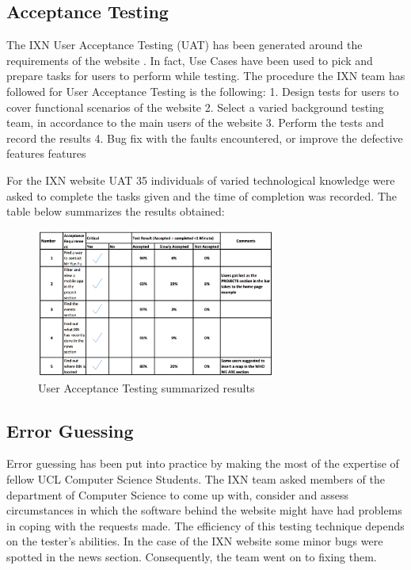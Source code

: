 \documentclass[fontsize=10pt]{extarticle}
\numberwithin{figure}{section} %
\begin{document}
\hypertarget{acceptance-testing}{%
\subsection{Acceptance Testing}\label{acceptance-testing}}

The IXN User Acceptance Testing (UAT) has been generated around the
requirements of the website \cite{g7} . In fact, Use Cases have been
used to pick and prepare tasks for users to perform while testing. The
procedure the IXN team has followed for User Acceptance Testing is the
following: 1. Design tests for users to cover functional scenarios of
the website 2. Select a varied background testing team, in accordance to
the main users of the website 3. Perform the tests and record the
results 4. Bug fix with the faults encountered, or improve the defective
features features

For the IXN website UAT 35 individuals of varied technological knowledge
were asked to complete the tasks given and the time of completion was
recorded. The table below summarizes the results obtained:

\begin{figure}[H]
      \centering
      \includegraphics[trim = 0 0 0 0, clip, width=0.7\textwidth]{ph4.png}
      \caption{User Acceptance Testing summarized results}
 \end{figure}

\hypertarget{error-guessing}{%
\subsection{Error Guessing}\label{error-guessing}}

Error guessing has been put into practice by making the most of the
expertise of fellow UCL Computer Science Students. The IXN team asked
members of the department of Computer Science to come up with, consider
and assess circumstances in which the software behind the website might
have had problems in coping with the requests made. The efficiency of
this testing technique depends on the tester's abilities. In the case of
the IXN website some minor bugs were spotted in the news section.
Consequently, the team went on to fixing them.
\end{document}
